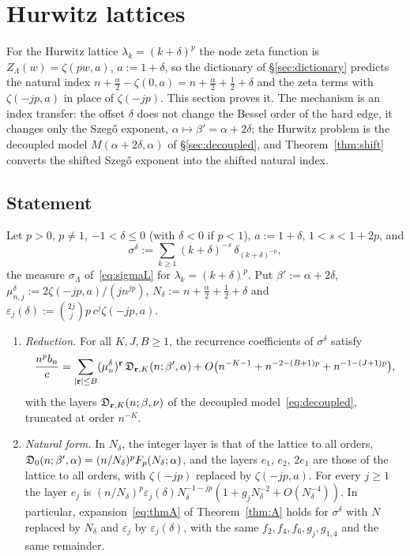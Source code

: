 \section{Hurwitz lattices}\label{sec:hurwitz-thm}

For the Hurwitz lattice $\lambda_k=(k+\delta)^p$ the node zeta function is $Z_\Lambda(w)=\zeta(pw,a)$, $a:=1+\delta$, so the dictionary
of \S\ref{sec:dictionary} predicts the natural index $n+\frac\alpha2-\zeta(0,a)=n+\frac\alpha2+\frac12+\delta$ and the zeta terms with
$\zeta(-jp,a)$ in place of $\zeta(-jp)$. This section proves it. The mechanism is an index transfer: the offset $\delta$ does not
change the Bessel order of the hard edge, it changes only the Szeg\H{o} exponent, $\alpha\mapsto\beta'=\alpha+2\delta$; the Hurwitz
problem is the decoupled model $M(\alpha+2\delta,\alpha)$ of \S\ref{sec:decoupled}, and Theorem~\ref{thm:shift} converts the shifted
Szeg\H{o} exponent into the shifted natural index.

\subsection{Statement}\label{sec:H-statement}
\begin{theorem}\label{thm:H}
Let $p>0$, $p\ne1$, $-1<\delta\le0$ (with $\delta<0$ if $p<1$), $a:=1+\delta$, $1<s<1+2p$, and
\[
  \sigma^\delta:=\sum_{k\ge1}(k+\delta)^{-s}\,\delta_{(k+\delta)^{-p}} ,
\]
the measure $\sigma_\Lambda$ of~\eqref{eq:sigmaL} for $\lambda_k=(k+\delta)^p$. Put $\beta':=\alpha+2\delta$,
$\mu^\delta_{n,j}:=2\zeta(-jp,a)/(jn^{jp})$, $N_\delta:=n+\frac\alpha2+\frac12+\delta$ and $\varepsilon_j(\delta):=\binom{2j}jp\,c^j\zeta(-jp,a)$.
\begin{enumerate}
\item[(i)] \emph{Reduction.} For all $K,J,B\ge1$, the recurrence coefficients of $\sigma^\delta$ satisfy
\[
  \frac{n^pb_n}c=\sum_{|\mathbf r|\le B}(\mu^\delta_n)^{\mathbf r}\,\mathfrak D_{\mathbf r,K}(n;\beta',\alpha)+O\bigl(n^{-K-1}+n^{-2-(B+1)p}+n^{-1-(J+1)p}\bigr),
\]
with the layers $\mathfrak D_{\mathbf r,K}(n;\beta,\nu)$ of the decoupled model~\eqref{eq:decoupled}, truncated at order $n^{-K}$.
\item[(ii)] \emph{Natural form.} In $N_\delta$, the integer layer is that of the lattice to all orders,
$\mathfrak D_0(n;\beta',\alpha)=(n/N_\delta)^pF_p(N_\delta;\alpha)$, and the layers $e_1$, $e_2$, $2e_1$ are those of the lattice to all orders, with
$\zeta(-jp)$ replaced by $\zeta(-jp,a)$. For every $j\ge1$ the layer $e_j$ is $(n/N_\delta)^p\varepsilon_j(\delta)N_\delta^{-1-jp}(1+g_jN_\delta^{-2}+O(N_\delta^{-4}))$.
In particular, expansion~\eqref{eq:thmA} of Theorem~\ref{thm:A} holds for $\sigma^\delta$ with $N$ replaced by $N_\delta$ and
$\varepsilon_j$ by $\varepsilon_j(\delta)$, with the same $f_2,f_4,f_6,g_j,g_{1,4}$ and the same remainder.
\end{enumerate}
\end{theorem}

